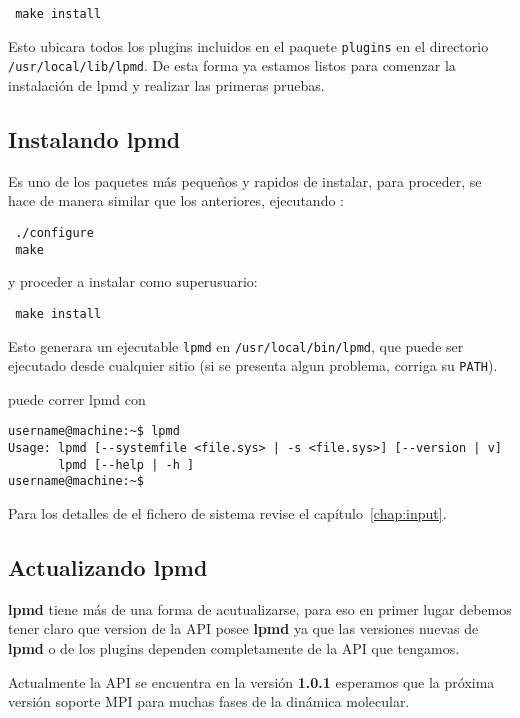 \documentclass[a4paper,10pt]{scrbook}
\newcommand{\lpmd}{\textbf{lpmd }}
\begin{document}
\begin{verbatim}
 make install
\end{verbatim}

Esto ubicara todos los plugins incluidos en el paquete \verb|plugins| en el directorio \verb|/usr/local/lib/lpmd|. De esta forma ya estamos listos para comenzar la instalaci\'on de lpmd y realizar las primeras pruebas.

\subsection{Instalando lpmd}

Es uno de los paquetes m\'as peque\~nos y rapidos de instalar, para proceder, se hace de manera similar que los anteriores, ejecutando :

\begin{verbatim}
 ./configure 
 make
\end{verbatim}

y proceder a instalar como superusuario:

\begin{verbatim}
 make install
\end{verbatim}

Esto generara un ejecutable \verb|lpmd| en \verb|/usr/local/bin/lpmd|, que puede ser ejecutado desde cualquier sitio (si se presenta algun problema, corriga su \verb|PATH|).

puede correr lpmd con

\begin{verbatim}
username@machine:~$ lpmd
Usage: lpmd [--systemfile <file.sys> | -s <file.sys>] [--version | v]
       lpmd [--help | -h ]
username@machine:~$
\end{verbatim}

Para los detalles de el fichero de sistema revise el cap\'itulo~\ref{chap:input}.

\subsection{Actualizando lpmd}

\lpmd tiene m\'as de una forma de acutualizarse, para eso en primer lugar debemos tener claro que version de la API posee \lpmd ya que las versiones nuevas de \lpmd o de los plugins dependen completamente de la API que tengamos.

Actualmente la API se encuentra en la versi\'on \textbf{1.0.1} esperamos que la pr\'oxima versi\'on soporte MPI para muchas fases de la din\'amica molecular.
\end{document}
